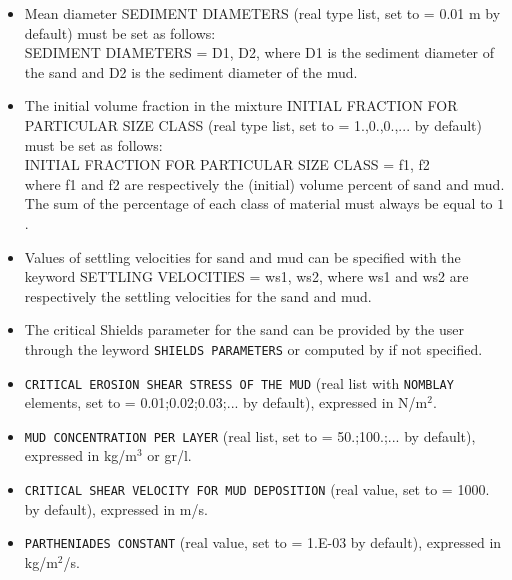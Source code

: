 \begin{itemize}
\item Mean diameter {\ttfamily SEDIMENT DIAMETERS} (real type list, set to {\ttfamily = 0.01} m by default) must be set as follows:\\
{\ttfamily SEDIMENT DIAMETERS = D1, D2}, where {\ttfamily D1} is the sediment diameter of the sand and {\ttfamily D2} is the sediment diameter of the mud.

\item The initial volume fraction in the mixture {\ttfamily INITIAL FRACTION FOR PARTICULAR SIZE CLASS} (real type list, set to {\ttfamily = 1.,0.,0.,...} by default) must be set as follows:\\
  
{\ttfamily INITIAL FRACTION FOR PARTICULAR SIZE CLASS = f1, f2}\\
where {\ttfamily f1} and {\ttfamily f2} are respectively the (initial) volume percent of sand and mud. The sum of the percentage of each class of material must always be equal to $1$.

\item Values of settling velocities for sand and mud can be specified with the keyword {\ttfamily SETTLING VELOCITIES = ws1, ws2}, where {\ttfamily ws1} and {\ttfamily ws2} are respectively the settling velocities for the sand and mud.

\item The critical Shields parameter for the sand can be provided by the user through the leyword \texttt{SHIELDS PARAMETERS} or computed by \sisyphe{} if not specified.

\item \texttt{CRITICAL EROSION SHEAR STRESS OF THE MUD} (real list with \texttt{NOMBLAY} elements, set to {\ttfamily = 0.01;0.02;0.03;...} by default), expressed in N/m$^2$.\\

\item \texttt{MUD CONCENTRATION PER LAYER} (real list, set to {\ttfamily = 50.;100.;...} by default), expressed in kg/m$^3$ or gr/l.

\item \texttt{CRITICAL SHEAR VELOCITY FOR MUD DEPOSITION} (real value, set to {\ttfamily = 1000.} by default), expressed in m/s.

\item \texttt{PARTHENIADES CONSTANT} (real value, set to {\ttfamily = 1.E-03} by default), expressed in kg/m$^2$/s.
\end{itemize}

